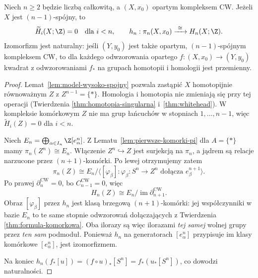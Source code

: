 \begin{twierdzenie}
\label{thm:hurewicz-wyzszy}
Niech $n\geq2$ będzie liczbą całkowitą,
a $(X,x_0)$ opartym kompleksem CW.
Jeżeli $X$ jest $(n-1)$-spójny, to
\[
 \widetilde H_i(X;\Z)=0
 \quad\text{dla }i<n,
 \qquad
 h_n:\pi_n(X,x_0)
 \xrightarrow{\ \cong\ }H_n(X;\Z).
\]
Izomorfizm jest naturalny: jeśli $(Y,y_0)$ jest także
opartym, $(n-1)$-spójnym kompleksem CW, to dla każdego
odwzorowania opartego $f:(X,x_0)\to(Y,y_0)$
kwadrat z odwzorowaniami $f_*$ na grupach homotopii
i homologii jest przemienny.
\end{twierdzenie}
\begin{proof}
Lemat~\ref{lem:model-wysoko-spojny}
pozwala zastąpić
$X$ homotopijnie
równoważnym $Z$
z $Z^{n-1}=\{*\}$.
Homologia i homotopia
nie zmieniają się
przy tej operacji
(Twierdzenia
\ref{thm:homotopia-singularna}
i~\ref{thm:whitehead}).
W kompleksie komórkowym
$Z$ nie ma grup
łańcuchów w
stopniach $1,\ldots,n-1$,
więc
$\widetilde H_i(Z)=0$
dla $i<n$.

Niech
$E_n=\bigoplus_{\alpha\in I_n}
\Z[e_\alpha^n]$.
Z Lematu~\ref{lem:pierwsze-komorki-pi}
dla $A=\{*\}$ mamy
$\pi_n(Z^n)\cong E_n$.
Włączenie
$Z^n\hookrightarrow Z$
jest surjekcją
na $\pi_n$,
a jądrem są relacje
narzucone przez
$(n+1)$-komórki.
Po lewej otrzymujemy
zatem
\[
 \pi_n(Z)
 \cong
 E_n/\langle
   [\varphi_\beta]:
   \varphi_\beta:S^n\to Z^n
   \text{ dołącza }e_\beta^{n+1}
 \rangle.
\]
Po prawej
$\partial_n^{\mathrm{CW}}=0$,
bo $C_{n-1}^{\mathrm{CW}}=0$,
więc
\[
 H_n(Z)
 \cong E_n/
     \operatorname{im}
       \partial_{n+1}^{\mathrm{CW}}.
\]
Obraz $[\varphi_\beta]$
przez $h_n$ jest
klasą brzegową
$(n+1)$-komórki:
jej współczynniki
w bazie $E_n$
to te same stopnie
odwzorowań dołączających
z Twierdzenia
\ref{thm:formula-komorkowa}.
Oba ilorazy są
więc ilorazami
\emph{tej samej}
wolnej grupy przez
\emph{ten sam}
podmoduł.
Ponieważ $h_n$
na generatorach
$[e_\alpha^n]$
przypisuje im
klasy komórkowe
$[e_\alpha^n]$,
jest izomorfizmem.

Na koniec
$h_n(f_*[u])
=(f\circ u)_*[S^n]
=f_*(u_*[S^n])$,
co dowodzi
naturalności.
\end{proof}

